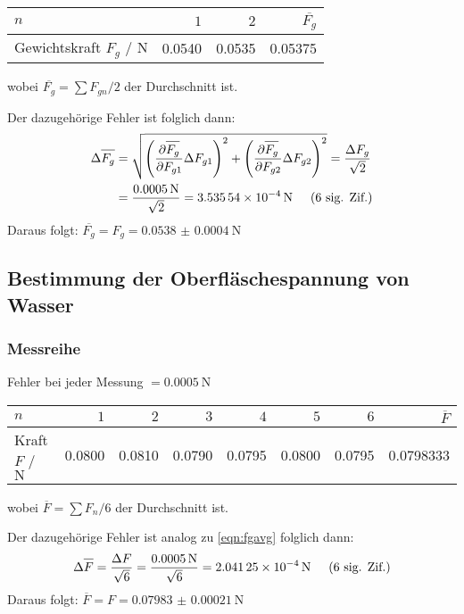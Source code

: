 		\begin{center}
			\begin{tabular}{l rr r}
				\toprule
				$n$ & $1$ & $2$ & $\overbar{F_g}$ \\
				\midrule
				Gewichtskraft $F_g$ / $\si{\newton}$ & \num{0.0540} & \num{0.0535} & \num{0.05375} \\
				\bottomrule
			\end{tabular}
		\end{center}
		wobei $\overbar{F_g} = \sum{F_{gn}}/2$ der Durchschnitt ist.

		Der dazugehörige Fehler ist folglich dann:
		\begin{align}
			\Delta \overbar{F_g} &= \gausserror{\overbar{F_g}}{F_{g1}, F_{g2}} = \frac{\Delta F_g}{\sqrt{2}} \notag \\
			&= \frac{\SI{0.0005}{\newton}}{\sqrt{2}} = \SI{3.53554e-4}{\newton} \sigfig{6} \label{eqn:fgavg}
		\end{align}
		Daraus folgt: $\overbar{F_g} = F_g = \SI{0.0538(4)}{\newton}$

	\subsection{Bestimmung der Oberfläschespannung von Wasser}
		\subsubsection{Messreihe}
			Fehler bei jeder Messung $= \SI{0.0005}{\newton}$ 

			\begin{center}
				\begin{tabular}{l *{6}{r} r}
					\toprule
					$n$ & $1$ & $2$ & $3$ & $4$ & $5$ & $6$ & $\overbar{F}$ \\
					\midrule
					Kraft $F$ / $\si{\newton}$ & \num{0.0800} & \num{0.0810} & \num{0.0790} & \num{0.0795} & \num{0.0800}{} & \num{0.0795} & \num{0.0798333} \\
					\bottomrule
				\end{tabular}
			\end{center}
			wobei $\overbar{F} = \sum{F_n}/6$ der Durchschnitt ist.

			Der dazugehörige Fehler ist analog zu \eqref{eqn:fgavg} folglich dann:
			\begin{equation}
				\Delta \overbar{F} = \frac{\Delta F}{\sqrt{6}} = \frac{\SI{0.0005}{\newton}}{\sqrt{6}} = \SI{2,04125e-4}{\newton} \sigfig{6}
			\end{equation}
			Daraus folgt: $\overbar{F} = F = \SI{0.07983(21)}{\newton}$


